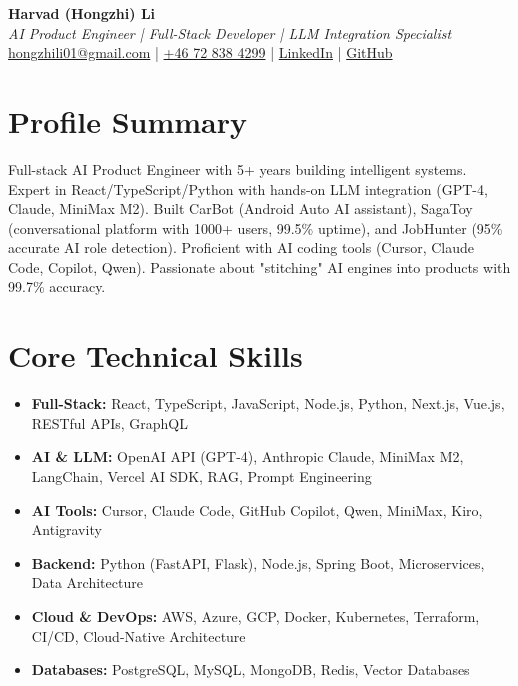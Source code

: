 \documentclass[11pt,a4paper]{article}
\begin{document}
\begin{center}
{\LARGE \textbf{Harvad (Hongzhi) Li}}\\[10pt]
{\Large \textit{AI Product Engineer | Full-Stack Developer | LLM Integration Specialist}}\\[10pt]
\textcolor{linkedinblue}{\href{mailto:hongzhili01@gmail.com}{hongzhili01@gmail.com} | \href{tel:+46728384299}{+46 72 838 4299} | \href{https://www.linkedin.com/in/harvad/}{LinkedIn} | \href{https://github.com/bluehawana}{GitHub}}
\end{center}

\vspace{8pt}

\section*{Profile Summary}

Full-stack AI Product Engineer with 5+ years building intelligent systems. Expert in React/TypeScript/Python with hands-on LLM integration (GPT-4, Claude, MiniMax M2). Built CarBot (Android Auto AI assistant), SagaToy (conversational platform with 1000+ users, 99.5\% uptime), and JobHunter (95\% accurate AI role detection). Proficient with AI coding tools (Cursor, Claude Code, Copilot, Qwen). Passionate about "stitching" AI engines into products with 99.7\% accuracy.

\section*{Core Technical Skills}

\begin{itemize}[noitemsep]
\item \textbf{Full-Stack:} React, TypeScript, JavaScript, Node.js, Python, Next.js, Vue.js, RESTful APIs, GraphQL
\item \textbf{AI \& LLM:} OpenAI API (GPT-4), Anthropic Claude, MiniMax M2, LangChain, Vercel AI SDK, RAG, Prompt Engineering
\item \textbf{AI Tools:} Cursor, Claude Code, GitHub Copilot, Qwen, MiniMax, Kiro, Antigravity
\item \textbf{Backend:} Python (FastAPI, Flask), Node.js, Spring Boot, Microservices, Data Architecture
\item \textbf{Cloud \& DevOps:} AWS, Azure, GCP, Docker, Kubernetes, Terraform, CI/CD, Cloud-Native Architecture
\item \textbf{Databases:} PostgreSQL, MySQL, MongoDB, Redis, Vector Databases
\end{itemize}
\end{document}
